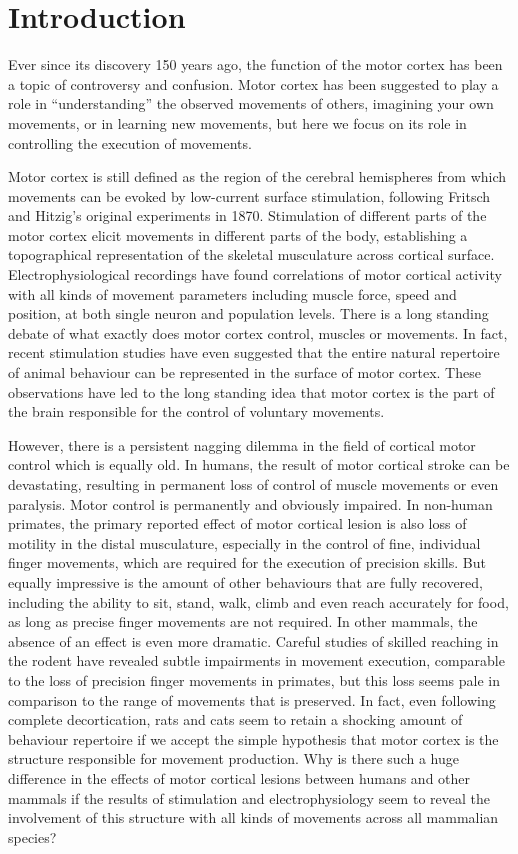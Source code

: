\section{Introduction}

Ever since its discovery 150 years ago, the function of the motor cortex has been a topic of controversy and confusion. Motor cortex has been suggested to play a role in ``understanding'' the observed movements of others, imagining your own movements, or in learning new movements, but here we focus on its role in controlling the execution of movements.

Motor cortex is still defined as the region of the cerebral hemispheres from which movements can be evoked by low-current surface stimulation, following Fritsch and Hitzig's original experiments in 1870. Stimulation of different parts of the motor cortex elicit movements in different parts of the body, establishing a topographical representation of the skeletal musculature across cortical surface. Electrophysiological recordings have found correlations of motor cortical activity with all kinds of movement parameters including muscle force, speed and position, at both single neuron and population levels. There is a long standing debate of what exactly does motor cortex control, muscles or movements. In fact, recent stimulation studies have even suggested that the entire natural repertoire of animal behaviour can be represented in the surface of motor cortex. These observations have led to the long standing idea that motor cortex is the part of the brain responsible for the control of voluntary movements.

However, there is a persistent nagging dilemma in the field of cortical motor control which is equally old. In humans, the result of motor cortical stroke can be devastating, resulting in permanent loss of control of muscle movements or even paralysis. Motor control is permanently and obviously impaired. In non-human primates, the primary reported effect of motor cortical lesion is also loss of motility in the distal musculature, especially in the control of fine, individual finger movements, which are required for the execution of precision skills. But equally impressive is the amount of other behaviours that are fully recovered, including the ability to sit, stand, walk, climb and even reach accurately for food, as long as precise finger movements are not required. In other mammals, the absence of an effect is even more dramatic. Careful studies of skilled reaching in the rodent have revealed subtle impairments in movement execution, comparable to the loss of precision finger movements in primates, but this loss seems pale in comparison to the range of movements that is preserved. In fact, even following complete decortication, rats and cats seem to retain a shocking amount of behaviour repertoire if we accept the simple hypothesis that motor cortex is the structure responsible for movement production. Why is there such a huge difference in the effects of motor cortical lesions between humans and other mammals if the results of stimulation and electrophysiology seem to reveal the involvement of this structure with all kinds of movements across all mammalian species?

